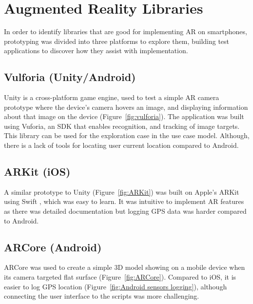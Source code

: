 
\section{Augmented Reality Libraries}
In order to identify libraries that are good for implementing AR on smartphones, prototyping was divided into three platforms to explore them, building test applications to discover how they assist with implementation.

\subsection*{Vulforia (Unity/Android)}
Unity is a cross-platform game engine, used to test a simple AR camera prototype where the device's camera hovers an image, and displaying information about that image on the device (Figure~\ref{fig:vulforia}). The application was built using Vuforia, an SDK that enables recognition, and tracking of image targets. This library can be used for the exploration case in the use case model. Although, there is a lack of tools for locating user current location compared to Android.

\subsection*{ARKit (iOS)}
A similar prototype to Unity (Figure~\ref{fig:ARKit}) was built on Apple's ARKit using Swift \cite{applear}, which was easy to learn. It was intuitive to implement AR features as there was detailed documentation but logging GPS data was harder compared to Android.

\subsection*{ARCore (Android)}
ARCore was used to create a simple 3D model showing on a mobile device when its camera targeted flat surface (Figure~\ref{fig:ARCore}). Compared to iOS, it is easier to log GPS location (Figure~\ref{fig:Android sensors logging}), although connecting the user interface to the scripts was more challenging.

